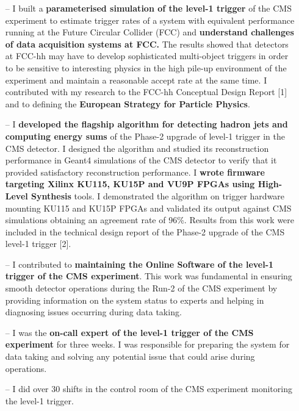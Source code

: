\documentclass[10pt,a4paper]{altacv}
\begin{document}
\begin{itemize}
    \setlength{\itemindent}{0.5em}
    \item[--]   I built a \textbf{parameterised simulation of the level-1 trigger} of the CMS experiment to estimate trigger rates of a system with equivalent performance running at the Future Circular Collider (FCC) and \textbf{understand challenges of data acquisition systems at FCC.} 
    The results showed that detectors at FCC-hh may have to develop sophisticated multi-object triggers in order to be sensitive to interesting physics in the high pile-up environment of the experiment and maintain a reasonable accept rate at the same time. 
    I contributed with my research to the FCC-hh Conceptual Design Report [1] and to defining the \textbf{European Strategy for Particle Physics}.
    \item[--]   I \textbf{developed the flagship algorithm for detecting hadron jets and computing energy sums} of the Phase-2 upgrade of level-1 trigger in the CMS detector. I designed the algorithm and studied its reconstruction performance in Geant4 simulations of the CMS detector to verify that it provided satisfactory reconstruction performance. I \textbf{wrote firmware targeting Xilinx KU115, KU15P and VU9P FPGAs using High-Level Synthesis} tools. I demonstrated the algorithm on trigger hardware mounting KU115 and KU15P FPGAs and validated its output against CMS simulations obtaining an agreement rate of 96\%. 
    Results from this work were included in the technical design report of the Phase-2 upgrade of the CMS level-1 trigger [2].
    \item[--] I contributed to \textbf{maintaining the Online Software of the level-1 trigger of the CMS experiment}. This work was fundamental in ensuring smooth detector operations during the Run-2 of the CMS experiment by providing information on the system status to experts and helping in diagnosing issues occurring during data taking.
    \item[--] I was the \textbf{on-call expert of the level-1 trigger of the CMS experiment} for three weeks. I was responsible for preparing the system for data taking and solving any potential issue that could arise during operations.
    \item[--] I did over 30 shifts in the control room of the CMS experiment monitoring the level-1 trigger.
\end{itemize}
\end{document}
